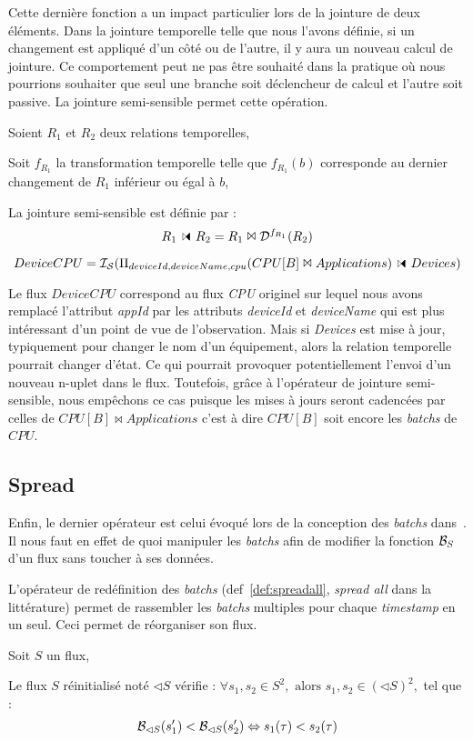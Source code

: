Cette dernière fonction a un impact particulier lors de la jointure de deux éléments. Dans la jointure temporelle telle que nous l'avons définie, si un changement est appliqué d'un côté ou de l'autre, il y aura un nouveau calcul de jointure. Ce comportement peut ne pas être souhaité dans la pratique où nous pourrions souhaiter que seul une branche soit déclencheur de calcul et l'autre soit passive. La jointure semi-sensible permet cette opération.


\begin{defi}
    Soient $R_1$ et $R_2$ deux relations temporelles,

    Soit $f_{R_1}$ la transformation temporelle telle que $f_{R_1}(b)$ corresponde au dernier changement de $R_1$ inférieur ou égal à $b$,

    La jointure semi-sensible est définie par :
        $$R_1\ssjoin R_2 = R_1 \Join \D^{f_{R_1}}(R_2)$$
\end{defi}
\begin{example}
    $$DeviceCPU=\IS(\Pi_{deviceId,deviceName,cpu}(CPU[B]\Join Applications)\ssjoin Devices)$$

Le flux $DeviceCPU$ correspond au flux \textit{CPU} originel sur lequel nous avons remplacé l'attribut \textit{appId} par les attributs \textit{deviceId} et \textit{deviceName} qui est plus intéressant d'un point de vue de l'observation. Mais si \textit{Devices} est mise à jour, typiquement pour changer le nom d'un équipement, alors la relation temporelle pourrait changer d'état. Ce qui pourrait provoquer potentiellement l'envoi d'un nouveau n-uplet dans le flux. Toutefois, grâce à l'opérateur de jointure semi-sensible, nous empêchons ce cas puisque les mises à jours seront cadencées par celles de $CPU[B]\Join Applications$ c'est à dire $CPU[B]$ soit encore les \textit{batchs} de $CPU$.
\end{example}

\subsection{Spread}
Enfin, le dernier opérateur est celui évoqué lors de la conception des \textit{batchs} dans~\cite{Jain:spread}. Il nous faut en effet de quoi manipuler les \textit{batchs} afin de modifier la fonction $\mathcal{B}_S$ d'un flux sans toucher à ses données.

L'opérateur de redéfinition des \textit{batchs} (def~\ref{def:spreadall}, \textit{spread all} dans la littérature) permet de rassembler les \textit{batchs} multiples pour chaque \textit{timestamp} en un seul. Ceci permet de réorganiser son flux.
\begin{defi}\label{def:spreadall}
Soit $S$ un flux,

Le flux $S$ réinitialisé noté $\lhd S$ vérifie :
$\forall s_1, s_2\in S^2, \textrm{ alors } s_1, s_2 \in (\lhd S)^2,$ tel que :
$$\mathcal{B}_{\lhd S}(s_1') < \mathcal{B}_{\lhd S}(s_2') \Leftrightarrow s_1(\tau) < s_2(\tau)$$
\end{defi}

